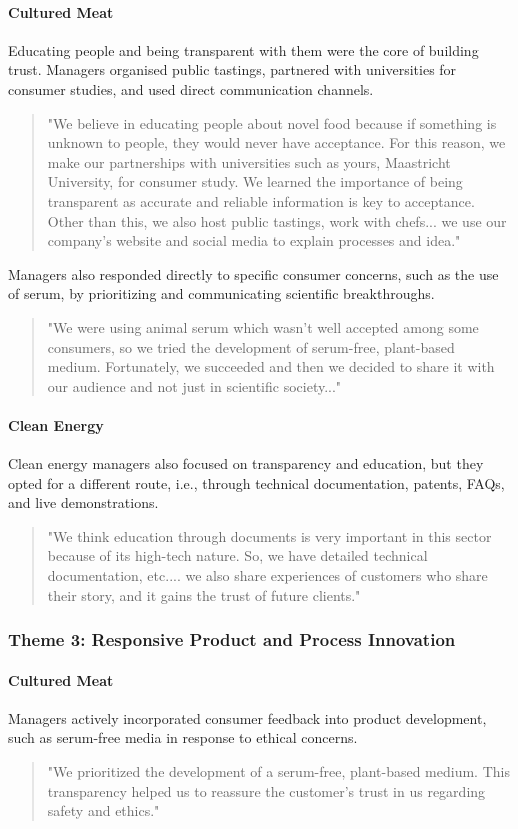 \paragraph{Cultured Meat}
Educating people and being transparent with them were the core of building trust. Managers organised public tastings, partnered with universities for consumer studies, and used direct communication channels.
\begin{quote}
	"We believe in educating people about novel food because if something is unknown to people, they would never have acceptance. For this reason, we make our partnerships with universities such as yours, Maastricht University, for consumer study. We learned the importance of being transparent as accurate and reliable information is key to acceptance. Other than this, we also host public tastings, work with chefs... we use our company's website and social media to explain processes and idea."
\end{quote}
Managers also responded directly to specific consumer concerns, such as the use of serum, by prioritizing and communicating scientific breakthroughs.
\begin{quote}
	"We were using animal serum which wasn't well accepted among some consumers, so we tried the development of serum-free, plant-based medium. Fortunately, we succeeded and then we decided to share it with our audience and not just in scientific society..."
\end{quote}

\paragraph{Clean Energy}
Clean energy managers also focused on transparency and education, but they opted for a different route, i.e., through technical documentation, patents, FAQs, and live demonstrations.
\begin{quote}
	"We think education through documents is very important in this sector because of its high-tech nature. So, we have detailed technical documentation, etc.... we also share experiences of customers who share their story, and it gains the trust of future clients."
\end{quote}

\subsubsection{Theme 3: Responsive Product and Process Innovation}
\paragraph{Cultured Meat}
Managers actively incorporated consumer feedback into product development, such as serum-free media in response to ethical concerns.
\begin{quote}
	"We prioritized the development of a serum-free, plant-based medium. This transparency helped us to reassure the customer's trust in us regarding safety and ethics."
\end{quote}

